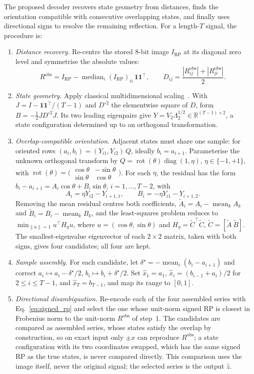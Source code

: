 \documentclass[preprint,review,12pt]{elsarticle}
\begin{document}
The proposed decoder recovers state geometry from distances, finds the orientation compatible with consecutive overlapping states, and finally uses directional signs to resolve the remaining reflection. For a length-$T$ signal, the procedure is:
\begin{enumerate}
\item \emph{Distance recovery.} Re-centre the stored 8-bit image $I_{\mathrm{RP}}$ at its diagonal zero level and symmetrise the absolute values:
\[
R^{\mathrm{obs}}=I_{\mathrm{RP}}-\operatorname{median}_i(I_{\mathrm{RP}})_{ii}\,\mathbf1\mathbf1^\top,\qquad
D_{ij}=\frac{|R^{\mathrm{obs}}_{ij}|+|R^{\mathrm{obs}}_{ji}|}{2}.
\]
\item \emph{State geometry.} Apply classical multidimensional scaling~\cite{Torgerson1952}. With $J=I-\mathbf1\mathbf1^\top/(T-1)$ and $D^{\circ2}$ the elementwise square of $D$, form $B=-\tfrac12JD^{\circ2}J$. Its two leading eigenpairs give $Y=V_2\Lambda_2^{1/2}\in\mathbb R^{(T-1)\times2}$, a state configuration determined up to an orthogonal transformation.
\item \emph{Overlap-compatible orientation.} Adjacent states must share one sample: for oriented rows $(a_i,b_i)=(Y_{i1},Y_{i2})\,Q$, ideally $b_i=a_{i+1}$. Parameterise the unknown orthogonal transform by $Q=\operatorname{rot}(\theta)\operatorname{diag}(1,\eta)$, $\eta\in\{-1,+1\}$, with $\operatorname{rot}(\theta)=\bigl(\begin{smallmatrix}\cos\theta&-\sin\theta\\ \sin\theta&\cos\theta\end{smallmatrix}\bigr)$. For each $\eta$, the residual has the form $b_i-a_{i+1}=A_i\cos\theta+B_i\sin\theta$, $i=1,\ldots,T-2$, with
\[
A_i=\eta Y_{i2}-Y_{i+1,1},\qquad
B_i=-\eta Y_{i1}-Y_{i+1,2}.
\]
Removing the mean residual centres both coefficients, $\tilde A_i=A_i-\operatorname{mean}_kA_k$ and $\tilde B_i=B_i-\operatorname{mean}_kB_k$, and the least-squares problem reduces to $\min_{\|u\|=1}u^\top H_\eta u$, where $u=(\cos\theta,\sin\theta)$ and $H_\eta=\tilde C^\top\tilde C$, $\tilde C=[\tilde A\ \tilde B]$. The smallest-eigenvalue eigenvector of each $2\times2$ matrix, taken with both signs, gives four candidates; all four are kept.
\item \emph{Sample assembly.} For each candidate, let $\delta^\star=-\operatorname{mean}_i(b_i-a_{i+1})$ and correct $a_i\mapsto a_i-\delta^\star/2$, $b_i\mapsto b_i+\delta^\star/2$. Set $\hat x_1=a_1$, $\hat x_i=(b_{i-1}+a_i)/2$ for $2\le i\le T-1$, and $\hat x_T=b_{T-1}$, and map its range to $[0,1]$.
\item \emph{Directional disambiguation.} Re-encode each of the four assembled series with Eq.~\eqref{eq:signed_rp} and select the one whose unit-norm signed RP is closest in Frobenius norm to the unit-norm $R^{\mathrm{obs}}$ of step~1. The candidates are compared as assembled series, whose states satisfy the overlap by construction, so on exact input only $\pm x$ can reproduce $R^{\mathrm{obs}}$; a state configuration with its two coordinates swapped, which has the same signed RP as the true states, is never compared directly. This comparison uses the image itself, never the original signal; the selected series is the output $\hat z$.
\end{enumerate}
\end{document}
